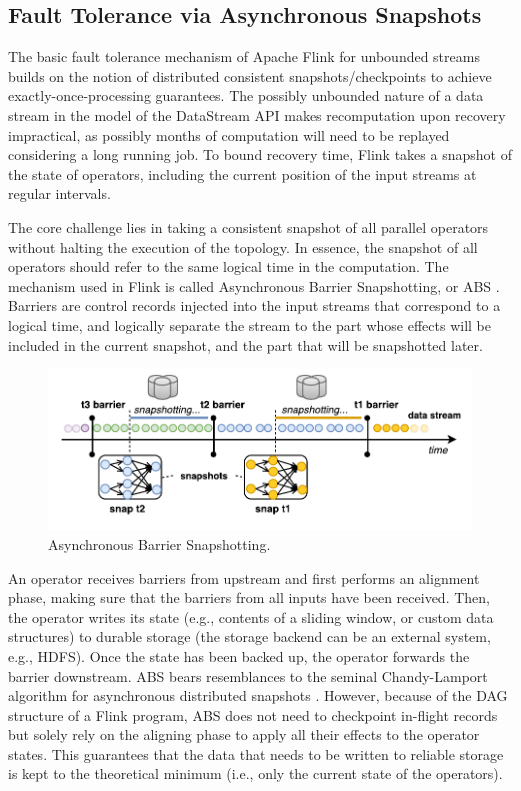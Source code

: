 \subsection{Fault Tolerance via Asynchronous Snapshots}
\label{sec:fault-tolerance}
The basic fault tolerance mechanism of Apache Flink for unbounded streams builds on the notion of distributed consistent snapshots/checkpoints to achieve exactly-once-processing guarantees. The possibly unbounded nature of a data stream in the model of the DataStream API makes recomputation upon recovery impractical, as possibly months of computation will need to be replayed considering a long running job. To bound recovery time, Flink takes a snapshot of the state of operators, including the current position of the input streams at regular intervals.

The core challenge lies in taking a consistent snapshot of all parallel operators without halting the execution of the topology. In essence, the snapshot of all operators should refer to the same logical time in the computation. The mechanism used in Flink is called Asynchronous Barrier Snapshotting, or ABS \cite{carbone2015lightweight}. Barriers are control records injected into the input streams that correspond to a logical time, and logically separate the stream to the part whose effects will be included in the current snapshot, and the part that will be snapshotted later.

\begin{figure}[ht]
	\centering  	
  	\includegraphics[width=.75\textwidth]{figs/snaps.pdf}
  	\vspace{-4mm}
	\caption{Asynchronous Barrier Snapshotting.}
	\vspace{-2mm}
	\label{fig:FlinkStack}
\end{figure}

An operator receives barriers from upstream and first performs an alignment phase, making sure that the barriers from all inputs have been received. Then, the operator writes its state (e.g., contents of a sliding window, or custom data structures) to durable storage (the storage backend can be an external system, e.g., HDFS). Once the state has been backed up, the operator forwards the barrier downstream. ABS bears resemblances to the seminal Chandy-Lamport algorithm for asynchronous distributed snapshots \cite{chandy1985distributed}. However, because of the DAG structure of a Flink program, ABS does not need to checkpoint in-flight records but solely rely on the aligning phase to apply all their effects to the operator states. This guarantees that the data that needs to be written to reliable storage is kept to the theoretical minimum (i.e., only the current state of the operators).

